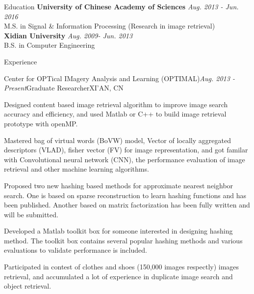 \documentclass{resume} %
\begin{document}

\begin{rSection}{Education}
{\bf University of Chinese Academy of Sciences} \hfill {\em Aug. 2013 - Jun. 2016} \\
M.S. in  Signal \& Information Processing (Research in image retrieval)\\
{\bf Xidian University} \hfill {\em Aug. 2009- Jun. 2013} \\
B.S. in Computer Engineering
\end{rSection}


\begin{rSection}{Experience}

\begin{rSubsection}{Center for OPTical IMagery Analysis and Learning (OPTIMAL)}{\em Aug. 2013 - Present}{Graduate Researcher}{XI'AN, CN}
\item Designed content based image retrieval algorithm to improve image search accuracy and efficiency, and used Matlab or C++ to build image retrieval prototype with openMP. 
\item Mastered bag of virtual words (BoVW) model, Vector of locally aggregated descriptors (VLAD), fisher vector (FV) for image representation, and got familar with Convolutional neural network (CNN), the performance evaluation of image retrieval and other machine learning algorithms.
\item Proposed two new hashing based methods for approximate nearest neighbor search. One is based on sparse reconstruction to learn hashing functions and has been published. Another based on matrix factorization has been fully written and will be submitted.
\item Developed a Matlab toolkit box for someone interested in designing hashing method. The toolkit box contains several popular hashing methods and various evaluations to validate performance is included.
\item Participated in contest of clothes and shoes (150,000 images respectly) images retrieval, and accumulated a lot of experience in duplicate image search and object retrieval.
\end{rSubsection}

\end{rSection}
\end{document}
